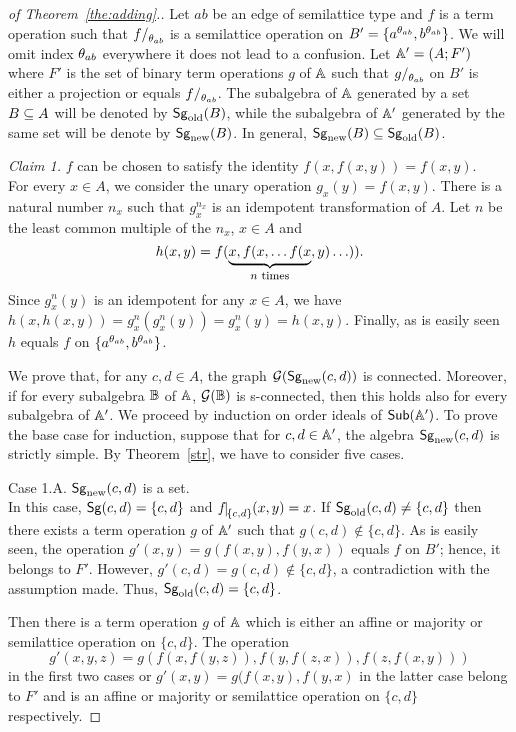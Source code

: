 \documentclass[11pt]{article}
\begin{document}
\begin{proof}[of Theorem~\ref{the:adding}.]
Let $ab$ be an edge of semilattice type and $f$ is a term operation
such that $f\fac{\th_{ab}}$ is a semilattice operation on
$B'=\{a^{\theta_{ab}},b^{\theta_{ab}}\}$. We will omit index
$\theta_{ab}$ everywhere it does not lead to a confusion. Let
${\mathbb A}'=(A;F')$ where $F'$ is the set of binary term operations $g$ of
${\mathbb A}$ such that $g\fac{\th_{ab}}$ on $B'$ is either a projection or
equals $f\fac{\th_{ab}}$. The subalgebra of ${\mathbb A}$ generated by a set
$B\subseteq A$ will be denoted by ${\sf Sg}_{\mathrm{old}}(B)$, while the subalgebra of
${\mathbb A}'$ generated by the same set will be denote by ${\sf Sg}_{\mathrm{new}}(B)$. In
general, ${\sf Sg}_{\mathrm{new}}(B)\subseteq{\sf Sg}_{\mathrm{old}}(B)$.
\medskip

\noindent
{\em Claim 1.} $f$ can be chosen to satisfy the identity
$f(x,f(x,y))=f(x,y)$.\\[2mm]
For every $x\in A$, we consider the unary operation
$g_x(y)=f(x,y)$. There is  
a natural number $n_x$ such that $g_x^{n_x}$ is an idempotent transformation
of $A$. Let $n$ be the least common multiple of the $n_x$, $x\in A$ and 
$$
h(x,y)=f(\underbrace{x,f(x,\ldots f(x}_{\mbox{\footnotesize $n$
times}},y)\ldots)).
$$
Since $g^n_x(y)$ is an idempotent for any $x\in A$, we have
$h(x,h(x,y))=g^n_x(g^n_x(y))=g^n_x(y)=h(x,y)$. Finally, as is easily
seen $h$ equals $f$ on $\{a^{\theta_{ab}},b^{\theta_{ab}}\}$.
\medskip

We prove that, for any $c,d\in A$, the graph ${\mathcal G}({\sf Sg}_{\mathrm{new}}(c,d))$ is 
connected. Moreover, if for every subalgebra ${\mathbb B}$ of ${\mathbb A}$,
${\mathcal G}({\mathbb B})$ is s-connected, then this holds also for every subalgebra
of ${\mathbb A}'$. We proceed by induction on order ideals of ${\sf Sub}({\mathbb A}')$. To
prove the base case for induction, suppose that for $c,d\in{\mathbb A}'$, the
algebra ${\sf Sg}_{\mathrm{new}}(c,d)$ is strictly simple. By Theorem~\ref{str}, we
have to consider five cases.
\medskip

\noindent
{\sc Case 1.A.} ${\sf Sg}_{\mathrm{new}}(c,d)$ is a set.\\[2mm]
In this case, ${\sf Sg}(c,d)=\{c,d\}$ and $f\red{\{c,d\}}(x,y)=x$. If 
${\sf Sg}_{\mathrm{old}}(c,d)\ne\{c,d\}$ then there exists a term operation $g$ of
${\mathbb A}'$ such that $g(c,d)\not\in\{c,d\}$. As is easily seen, the
operation $g'(x,y)=g(f(x,y),f(y,x))$ equals $f$ on
$B'$; hence, it belongs to
$F'$. However, $g'(c,d)=g(c,d)\not\in\{c,d\}$, a contradiction with
the assumption made. Thus, ${\sf Sg}_{\mathrm{old}}(c,d)=\{c,d\}$. 

Then there is a term operation $g$ of ${\mathbb A}$ which is either an affine 
or majority or semilattice operation on $\{c,d\}$. The operation
$$
g'(x,y,z)=g(f(x,f(y,z)),f(y,f(z,x)),f(z,f(x,y)))
$$ 
in the first two cases or
$g'(x,y)=g(f(x,y),f(y,x)$ in the latter case belong to $F'$ and is an
affine or majority or semilattice operation on $\{c,d\}$ respectively.
\medskip


\end{proof}
\end{document}
